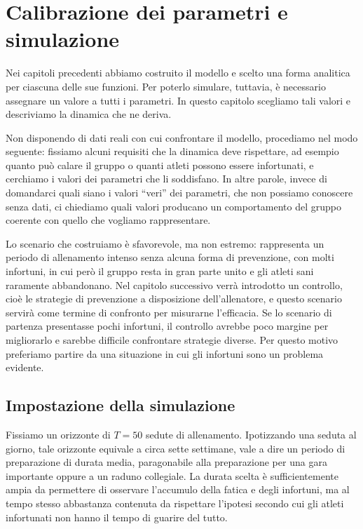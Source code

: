 \chapter{Calibrazione dei parametri e simulazione}\label{chap:simulazione}

Nei capitoli precedenti abbiamo costruito il modello e scelto una forma analitica per ciascuna delle sue funzioni. Per poterlo simulare, tuttavia, è necessario assegnare un valore a tutti i parametri. In questo capitolo scegliamo tali valori e descriviamo la dinamica che ne deriva. \par

Non disponendo di dati reali con cui confrontare il modello, procediamo nel modo seguente: fissiamo alcuni requisiti che la dinamica deve rispettare, ad esempio quanto può calare il gruppo o quanti atleti possono essere infortunati, e cerchiamo i valori dei parametri che li soddisfano. In altre parole, invece di domandarci quali siano i valori ``veri'' dei parametri, che non possiamo conoscere senza dati, ci chiediamo quali valori producano un comportamento del gruppo coerente con quello che vogliamo rappresentare. \par

Lo scenario che costruiamo è sfavorevole, ma non estremo: rappresenta un periodo di allenamento intenso senza alcuna forma di prevenzione, con molti infortuni, in cui però il gruppo resta in gran parte unito e gli atleti sani raramente abbandonano. Nel capitolo successivo verrà introdotto un controllo, cioè le strategie di prevenzione a disposizione dell'allenatore, e questo scenario servirà come termine di confronto per misurarne l'efficacia. Se lo scenario di partenza presentasse pochi infortuni, il controllo avrebbe poco margine per migliorarlo e sarebbe difficile confrontare strategie diverse. Per questo motivo preferiamo partire da una situazione in cui gli infortuni sono un problema evidente.

\section{Impostazione della simulazione}

Fissiamo un orizzonte di $T = 50$ sedute di allenamento. Ipotizzando una seduta al giorno, tale orizzonte equivale a circa sette settimane, vale a dire un periodo di preparazione di durata media, paragonabile alla preparazione per una gara importante oppure a un raduno collegiale. La durata scelta è sufficientemente ampia da permettere di osservare l'accumulo della fatica e degli infortuni, ma al tempo stesso abbastanza contenuta da rispettare l'ipotesi secondo cui gli atleti infortunati non hanno il tempo di guarire del tutto. \par

